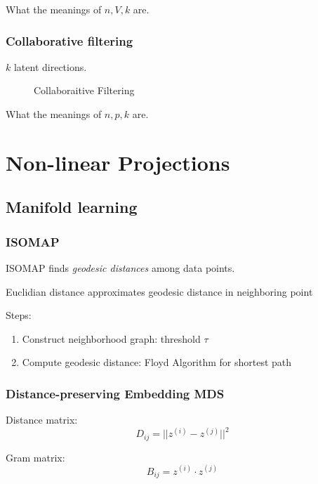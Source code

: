 \documentclass[a4paper]{report}
\begin{document}
What the meanings of $n, V, k$ are.
\subsection{Collaborative filtering}
$k$ latent directions. 

\begin{figure}[!htp]
\centering
{}
\caption{Collaboraitive Filtering}
\label{fig:collaborativeFiltering}
\end{figure}

What the meanings of $n, p, k$ are. 


\chapter{Non-linear Projections}
\section{Manifold learning}
\subsection{ISOMAP}
ISOMAP finds \textit{geodesic distances} among data points.

Euclidian distance approximates geodesic distance in neighboring point 

Steps:
\begin{enumerate}
\item Construct neighborhood graph: threshold $\tau$
\item Compute geodesic distance: Floyd Algorithm for shortest path
\end{enumerate}

\subsection{Distance-preserving Embedding MDS} 
Distance matrix:
$$
D_{ij} = ||z^{(i)}-z^{(j)}||^2
$$

Gram matrix:
$$
B_{ij} = z^{(i)}\cdot z^{(j)}
$$
\end{document}
